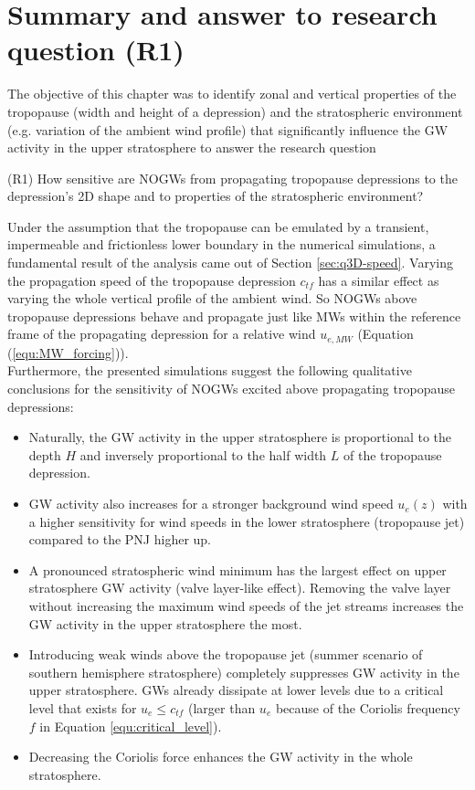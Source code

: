 \section{Summary and answer to research question (R1)}
\label{sec:q3D-summary}
The objective of this chapter was to identify zonal and vertical properties of the tropopause (width and height of a depression) and the stratospheric environment (e.g. variation of the ambient wind profile) that significantly influence the GW activity in the upper stratosphere to answer the research question
\begin{tcolorbox}[]
    (R1) How sensitive are NOGWs from propagating tropopause depressions to the depression's 2D shape and to properties of the stratospheric environment?
\end{tcolorbox}
Under the assumption that the tropopause can be emulated by a transient, impermeable and frictionless lower boundary in the numerical simulations, a fundamental result of the analysis came out of Section \ref{sec:q3D-speed}. Varying the propagation speed of the tropopause depression $c_{tf}$ has a similar effect as varying the whole vertical profile of the ambient wind. So NOGWs above tropopause depressions behave and propagate just like MWs within the reference frame of the propagating depression for a relative wind $u_{e,MW}$ (Equation (\ref{equ:MW_forcing})). \\
Furthermore, the presented simulations suggest the following qualitative conclusions for the sensitivity of NOGWs excited above propagating tropopause depressions:
\begin{itemize}
    \item Naturally, the GW activity in the upper stratosphere is proportional to the depth $H$ and inversely proportional to the half width $L$ of the tropopause depression.
    \item GW activity also increases for a stronger background wind speed $u_e(z)$ with a higher sensitivity for wind speeds in the lower stratosphere (tropopause jet) compared to the PNJ higher up.
    \item A pronounced stratospheric wind minimum has the largest effect on upper stratosphere GW activity (valve layer-like effect). Removing the valve layer without increasing the maximum wind speeds of the jet streams increases the GW activity in the upper stratosphere the most. 
    \item Introducing weak winds above the tropopause jet (summer scenario of southern hemisphere stratosphere) completely suppresses GW activity in the upper stratosphere. GWs already dissipate at lower levels due to a critical level that exists for $u_e \leq c_{tf}$ (larger than $u_e$ because of the Coriolis frequency $f$ in Equation \ref{equ:critical_level}).
    \item Decreasing the Coriolis force enhances the GW activity in the whole stratosphere.
\end{itemize}
